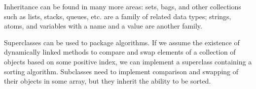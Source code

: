 Inheritance can be found in many more areas: sets, bags, and other 
collections such as lists, stacks, queues, etc. are a family of related data types; 
strings, atoms, and variables with a name and a value are another family. 

Superclasses can be used to package algorithms. 
If we assume the existence of dynamically linked methods to compare and 
swap elements of a collection of objects based on some positive index, 
we can implement a superclass containing a sorting algorithm. 
Subclasses need to implement comparison and swapping of their objects in some array, 
but they inherit the ability to be sorted.

\newpage{\thispagestyle{empty}\cleardoublepage}
